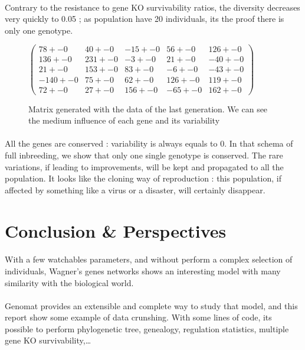 \documentclass[]{report} %
\begin{document}
    \paragraph*{}
    Contrary to the resistance to gene KO survivability ratios, the diversity decreases very quickly to 0.05 ; as population have 20 individuals, its the proof there is only one genotype.

    \begin{figure}[H] 
            \centering
            \small
    $
          \begin{pmatrix}
                78 +- 0 & 40 +- 0 & -15 +- 0 & 56 +- 0 & 126 +- 0 \\
                136 +- 0 & 231 +- 0 & -3 +- 0 & 21 +- 0 & -40 +- 0 \\
                21 +- 0 & 153 +- 0 & 83 +- 0 & -6 +- 0 & -43 +- 0 \\
                -140 +- 0 & 75 +- 0 & 62 +- 0 & 126 +- 0 & 119 +- 0 \\
                72 +- 0 & 27 +- 0 & 156 +- 0 & -65 +- 0 & 162 +- 0 
           \end{pmatrix}
    $
            \caption{\footnotesize Matrix generated with the data of the last generation. We can see the medium influence of each gene and its variability}
            \label{mat:ps20xg200xprt20xmr1-10-4}
    \end{figure}
    \paragraph*{}
    All the genes are conserved : variability is always equals to 0. 
    In that schema of full inbreeding, we show that only one single genotype is conserved. The rare variations, if leading to improvements, will be kept and propagated to all the population.
    It looks like the cloning way of reproduction : this population, if affected by something like a virus or a disaster, will certainly disappear.


\section{Conclusion \& Perspectives}
    \paragraph*{}
    With a few watchables parameters, and without perform a complex selection of individuals, 
    Wagner's genes networks shows an interesting model with many similarity with the biological world.
    \paragraph*{}
    Genomat provides an extensible and complete way to study that model, and this report show some example of data crunshing.
    With some lines of code, its possible to perform phylogenetic tree, genealogy, regulation statistics, multiple gene KO survivability,…
\end{document}
